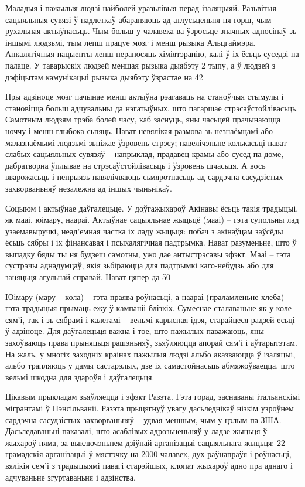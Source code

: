 Маладыя і пажылыя людзі найболей уразьлівыя перад ізаляцыяй. Разьвітыя сацыяльныя сувязі ў падлеткаў абараняюць ад атлусьценьня ня горш, чым рухальная актыўнасьць. Чым больш у чалавека ва ўзросьце значных адносінаў зь іншымі людзьмі, тым лепш працуе мозг і менш рызыка Альцгаймэра. Анкалягічныя пацыенты лепш пераносяць хіміятэрапію, калі ў іх ёсьць суседзі па палаце. У таварыскіх людзей меншая рызыка дыябэту 2 тыпу, а ў людзей з дэфіцытам камунікацыі рызыка дыябэту ўзрастае на 42%

Пры адзіноце мозг пачынае менш актыўна рэагаваць на станоўчыя стымулы і становіцца больш адчувальны да нэгатыўных, што пагаршае стрэсаўстойлівасьць. Самотным людзям трэба болей часу, каб заснуць, яны часьцей прачынаюцца ноччу і менш глыбока сьпяць. Нават невялікая размова зь незнаёмцамі або малазнаёмымі людзьмі зьніжае ўзровень стрэсу; павелічэньне колькасьці нават слабых сацыяльных сувязяў – напрыклад, прадавец крамы або сусед па доме, – дабратворна ўплывае на стрэсаўстойлівасьць і ўзровень шчасьця. А вось вварожасьць і непрыязь павялічваюць сьмяротнасьць ад сардэчна-сасудзістых захворваньняў незалежна ад іншых чыньнікаў. 

Соцыюм і актыўнае даўгалецьце. У доўгажыхароў Акінавы ёсьць такія традыцыі, як мааі, юімару, наараі. Актыўнае сацыяльнае жыцьцё (мааі) – гэта супольны лад узаемавыручкі, неад'емная частка іх ладу жыцьця: побач з акінаўцам заўсёды ёсьць сябры і іх фінансавая і псыхалягічная падтрымка. Нават разуменьне, што ў выпадку бяды ты ня будзеш самотны, ужо дае антыстрэсавы эфэкт. Мааі – гэта сустрэчы аднадумцаў, якія зьбіраюцца для падтрымкі каго-небудзь або для заняцьця агульнай справай. Нават цяпер да 50%

Юімару (мару – кола) – гэта праява роўнасьці, а наараі (праламленьне хлеба) – гэта традыцыя прымаць ежу ў кампаніі блізкіх. Сумеснае сталаваньне як у коле сям'і, так і зь сябрамі і калегамі – вельмі карысная ідэя, старайцеся радзей есьці ў адзіноце. Для даўгалецьця важна і тое, што пажылых паважаюць, яны захоўваюць права прыняцьця рашэньняў, зьяўляюцца апорай сям'і і аўтарытэтам. На жаль, у многіх заходніх краінах пажылыя людзі альбо аказваюцца ў ізаляцыі, альбо трапляюць у дамы састарэлых, дзе іх самастойнасьць абмяжоўваецца, што вельмі шкодна для здароўя і даўгалецьця.

Цікавым прыкладам зьяўляецца і эфэкт Разэта. Гэта горад, заснаваны італьянскімі мігрантамі ў Пэнсільваніі. Разэта прыцягнуў увагу дасьледнікаў нізкім узроўнем сардэчна-сасудзістых захворваньняў – удвая меншым, чым у цэлым па ЗША. Дасьледаваньні паказалі, што асаблівых адрозьненьняў у ладзе жыцьця ў жыхароў няма, за выключэньнем дзіўнай арганізацыі сацыяльнага жыцьця: 22 грамадскія арганізацыі ў мястэчку на 2000 чалавек, дух раўнапраўя і роўнасьці, вялікія сем'і з традыцыямі павагі старэйшых, клопат жыхароў адно пра аднаго і адчуваньне згуртаваньня і адзінства.

